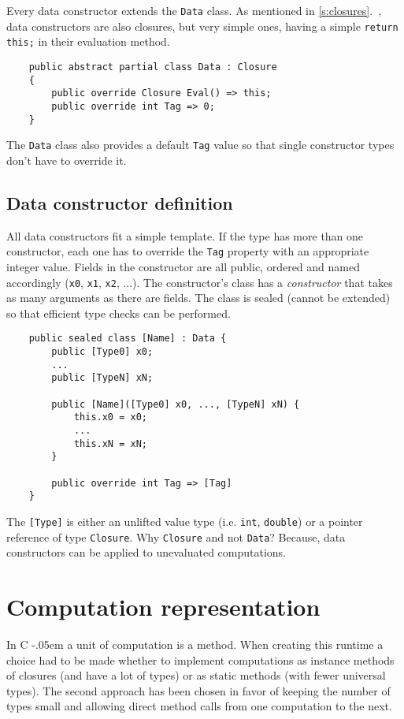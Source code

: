 \documentclass[en]{pracamgr}
\newcommand{\shrp}{%
  {\settoheight{\dimen0}{C}\kern-.05em \resizebox{!}{\dimen0}{\raisebox{\depth}{\textbf{\#}}}\hspace{1ex}}}
\newcommand{\myref}[1]{\ref{#1}.~\nameref{#1}}
\begin{document}
Every data constructor extends the \texttt{Data} class.
As mentioned in \myref{s:closures}, data constructors are
also closures, but very simple ones, having a simple
\texttt{return this;} in their evaluation method.

\begin{verbatim}
    public abstract partial class Data : Closure
    {
        public override Closure Eval() => this;
        public override int Tag => 0;
    }
\end{verbatim}

The \texttt{Data} class also provides a default \texttt{Tag}
value so that single constructor types don't have to override it.

\subsection{Data constructor definition}

All data constructors fit a simple template.
If the type has more than one constructor, each one has to
override the \texttt{Tag} property with an appropriate integer value.
Fields in the constructor are all public, ordered and named accordingly
(\texttt{x0}, \texttt{x1}, \texttt{x2}, ...).
The constructor's class has a \textit{constructor} that takes
as many arguments as there are fields.
The class is sealed (cannot be extended) so that efficient
type checks can be performed.

\begin{verbatim}
    public sealed class [Name] : Data {
        public [Type0] x0;
        ...
        public [TypeN] xN;

        public [Name]([Type0] x0, ..., [TypeN] xN) {
            this.x0 = x0;
            ...
            this.xN = xN;
        }

        public override int Tag => [Tag]
    }
\end{verbatim}

The \verb|[Type]| is either an unlifted value type
(i.e. \texttt{int}, \texttt{double}) or a pointer reference
of type \texttt{Closure}. Why \texttt{Closure} and not \texttt{Data}?
Because, data constructors can be applied to unevaluated computations.

\section{Computation representation}\label{s:computations}

In C\shrp a unit of computation is a method.
When creating this runtime a choice had to be made
whether to implement computations as instance methods
of closures (and have a lot of types) or as static methods
(with fewer universal types).
The second approach has been chosen in favor of keeping
the number of types small and allowing direct method calls
from one computation to the next.
\end{document}
